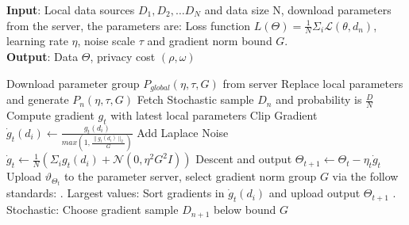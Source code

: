 \documentclass[journal,transmag]{IEEEtran}
\begin{document}
\begin{algorithm}[ht]
\caption{Differential privacy algorithm using federated stochastic gradient descent in user terminals}
\label{alg:Differentialuser terminate}

\hspace*{\algorithmicindent} 
\textbf{Input}: Local data sources $D_1,D_2,\dots D_N$ and data size N, download parameters from the server, the parameters are: Loss function $L(\Theta)=\frac{1}{N} \Sigma_i \mathcal{L}(\theta,d_n)$, learning rate $\eta$, noise scale $\tau$ and gradient norm bound $G$. \\

\hspace*{\algorithmicindent} 
\textbf{Output}: Data $\Theta$, privacy cost $(\rho,\omega)$ \\

\begin{algorithmic}[1]
\State Download parameter group $P_{global}(\eta,\tau,G)$ from server
\State Replace local parameters and generate $P_n (\eta,\tau,G)$
\State Fetch Stochastic sample $D_n$ and probability is $\frac{D}{N}$
\State Compute gradient $g_t$ with latest local parameters
\State Clip Gradient 
\State $\dot{g}_t (d_i)\leftarrow \frac{g_t (d_i)}{max(1,\frac{\|g_t (d_i)\|_2}{G})}$
\State Add Laplace Noise
\State $\dot{g}_t\leftarrow \frac{1}{N}( \Sigma_i g_t(d_i)+\mathcal{N}(0,\eta^2 G^2 I))$
\State          Descent and output
\State            $\Theta_{t+1}\leftarrow \Theta_t- \eta_t \dot{g}_t$
\EndFor
\EndFor
\State Upload $\vartheta_{\Theta_t}$ to the parameter server, select gradient norm group $G$ via the follow standards:
. Largest values: Sort gradients in $\dot{g}_t (d_i)$ and upload output $\Theta_{t+1}$
. Stochastic: Choose gradient sample $D_{n+1}$ below bound $G$ 
\EndProcedure
\end{algorithmic}
\end{algorithm}
\end{document}
